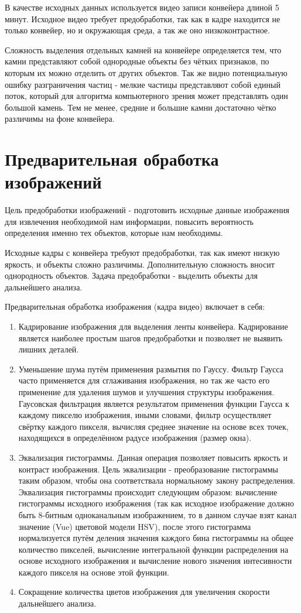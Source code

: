 \documentclass[specification,annotation,times]{itmo-student-thesis}
\begin{document}
В качестве исходных данных используется видео записи конвейера длиной 5 минут. Исходное видео требует предобработки, так как в кадре находится не только конвейер, но и окружающая среда, а так же оно низкоконтрастное. 

Сложность выделения отдельных камней на конвейере определяется тем, что камни представляют собой однородные объекты без чётких признаков, по которым их можно отделить от других объектов. Так же видно потенциальную ошибку разграничения частиц - мелкие частицы представляют собой единый поток, который для алгоритма компьютерного зрения может представлять один большой камень. Тем не менее, средние и большие камни достаточно чётко различимы на фоне конвейера.


\section{Предварительная обработка изображений}
Цель предобработки изображений - подготовить исходные данные изображения для извлечения необходимой нам информации, повысить вероятность определения именно тех объектов, которые нам необходимы.

Исходные кадры с конвейера требуют предобработки, так как имеют низкую яркость, и объекты сложно различимы. Дополнительную сложность вносит однородность объектов. Задача предобработки - выделить объекты для дальнейшего анализа.

Предварительная обработка изображения (кадра видео) включает в себя:
\begin{enumerate}
	\item Кадрирование изображения для выделения ленты конвейера. Кадрирование является наиболее простым шагов предобработки и позволяет не выявить лишних деталей.
	\item Уменьшение шума путём применения размытия по Гауссу. Фильтр Гаусса часто применяется для сглаживания изображения, но  так же часто его применение для удаления шумов и улучшения структуры  изображения. Гаусовская фильтрация является результатом применения функции Гаусса к каждому пикселю изображения, иными словами, фильтр осуществляет свёртку каждого пикселя, вычисляя среднее значение на основе всех точек, находящихся в определённом радусе изображения (размер окна).
	\item Эквализация гистограммы. Данная операция позволяет повысить яркость и контраст изображения. Цель эквализации - преобразование гистограммы таким образом, чтобы она соответствала нормальному закону распределения. Эквализация гистограммы происходит следующим образом: вычисление гистограммы исходного изображения (так как исходное изображение должно быть 8-битным одноканальным изображением, то в данном случае взят канал значение (Vue) цветовой модели HSV), после этого гистограмма нормализуется путём деления значения каждого бина гистограммы на общее количество пикселей, вычисление интегральной функции распределения на основе исходного изображения и вычисление нового значения интесивности каждого пикселя на основе этой функции.
	\item Сокращение количества цветов изображения для увеличения скорости дальнейшего анализа.
\end{enumerate}
\end{document}

